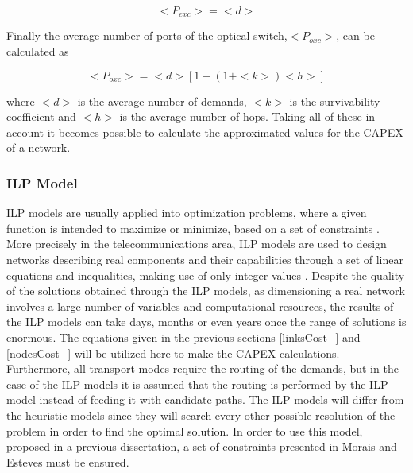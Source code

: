 \begin{equation}
<P_{exc}> = <d>
\label{Pexc_transp}
\end{equation}

\noindent
Finally the average number of ports of the optical switch,$<P_{oxc}>$, can be calculated as

\begin{equation}
<P_{oxc}> = <d> [1 + \left(1 + <k>\right) <h>]
\label{Poxc_transp}
\end{equation}

\noindent
where $<d>$ is the average number of demands, $<k>$	is the survivability coefficient and $<h>$ is the average number of hops. Taking all of these in account it becomes possible to calculate the approximated values for the CAPEX of a network.

\subsubsection{ILP Model}
\label{ilp}

ILP models are usually applied into optimization problems, where a given function is intended to maximize or minimize, based on a set of constraints \cite{Vasco}. More precisely in the telecommunications area, ILP models are used to design networks describing real components and their capabilities through a set of linear equations and inequalities, making use of only integer values \cite{TiagoEsteves}. Despite the quality of the solutions obtained through the ILP models, as dimensioning a real network involves a large number of variables and computational resources, the results of the ILP models can take days, months or even years once the range of solutions is enormous. The equations given in the previous sections \ref{linksCost_} and \ref{nodesCost_} will be utilized here to make the CAPEX calculations. Furthermore, all transport modes require the routing of the demands, but in the case of the ILP models it is assumed that the routing is performed by the ILP model instead of feeding it with candidate paths. The ILP models will differ from the heuristic models since they will search every other possible resolution of the problem in order to find the optimal solution. In order to use this model, proposed in a previous dissertation, a set of constraints presented in Morais \cite{RuiMoraisPhD} and Esteves \cite{TiagoEsteves} must be ensured.



